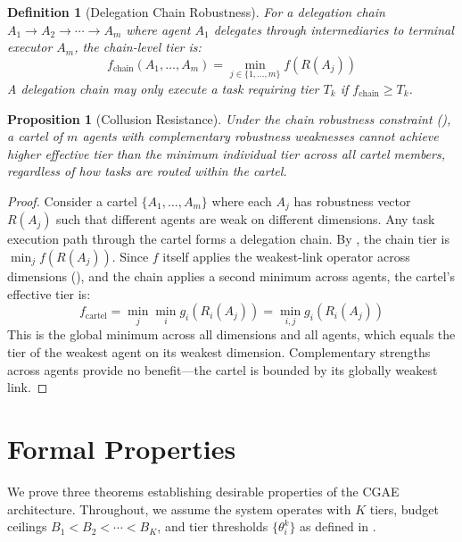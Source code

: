 \documentclass[11pt,a4paper]{article}
\newtheorem{proposition}[theorem]{Proposition}
\newtheorem{definition}{Definition}
\begin{document}
\begin{definition}[Delegation Chain Robustness]
\label{def:chain}
For a delegation chain $A_1 \to A_2 \to \cdots \to A_m$ where agent $A_1$ delegates through intermediaries to terminal executor $A_m$, the \emph{chain-level tier} is:
\begin{equation}
  f_{\text{chain}}(A_1, \ldots, A_m) = \min_{j \in \{1,\ldots,m\}} f(R(A_j))
\end{equation}
A delegation chain may only execute a task requiring tier $T_k$ if $f_{\text{chain}} \geq T_k$.
\end{definition}

\begin{proposition}[Collusion Resistance]
\label{prop:collusion}
Under the chain robustness constraint (), a cartel of $m$ agents with complementary robustness weaknesses cannot achieve higher effective tier than the minimum individual tier across all cartel members, regardless of how tasks are routed within the cartel.
\end{proposition}

\begin{proof}
Consider a cartel $\{A_1, \ldots, A_m\}$ where each $A_j$ has robustness vector $R(A_j)$ such that different agents are weak on different dimensions. Any task execution path through the cartel forms a delegation chain. By , the chain tier is $\min_j f(R(A_j))$. Since $f$ itself applies the weakest-link operator across dimensions (), and the chain applies a second minimum across agents, the cartel's effective tier is:
\begin{equation}
  f_{\text{cartel}} = \min_j \min_i g_i(R_i(A_j)) = \min_{i,j} g_i(R_i(A_j))
\end{equation}
This is the global minimum across all dimensions and all agents, which equals the tier of the weakest agent on its weakest dimension. Complementary strengths across agents provide no benefit---the cartel is bounded by its globally weakest link.
\end{proof}

\section{Formal Properties}

We prove three theorems establishing desirable properties of the CGAE architecture. Throughout, we assume the system operates with $K$ tiers, budget ceilings $B_1 < B_2 < \cdots < B_K$, and tier thresholds $\{\theta_i^k\}$ as defined in .
\end{document}
